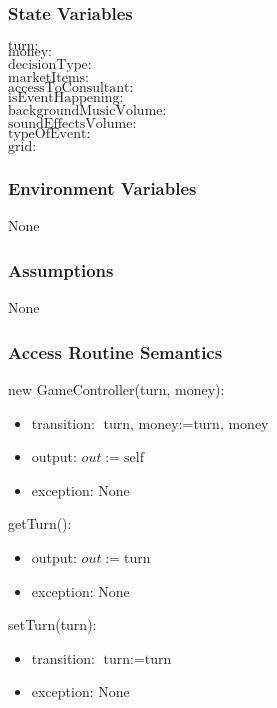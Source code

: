 \documentclass[12pt, titlepage]{article}
\begin{document}
\subsubsection{State Variables}
$\text{turn}:$ \\
$\text{money}:$ \\
$\text{decisionType}:$ \\
$\text{marketItems}:$ \\
$\text{accessToConsultant}:$  \\
$\text{isEventHappening}:$  \\
$\text{backgroundMusicVolume}:$  \\
$\text{soundEffectsVolume}:$  \\
$\text{typeOfEvent}:$  \\
$\text{grid}:$  \\
\subsubsection{Environment Variables}

None

\subsubsection{Assumptions}

None

\subsubsection{Access Routine Semantics}

\noindent new GameController(turn, money):
\begin{itemize}
\item transition: $\text{turn, money} := \text{turn, money}$
\item output: $out := \text{self}$
\item exception: None
\end{itemize}

\noindent getTurn():
\begin{itemize}
\item output: $out := \text{turn}$
\item exception: None
\end{itemize}


\noindent setTurn(turn):
\begin{itemize}
\item transition: $\text{turn} := \text{turn}$
\item exception: None
\end{itemize}
\end{document}
